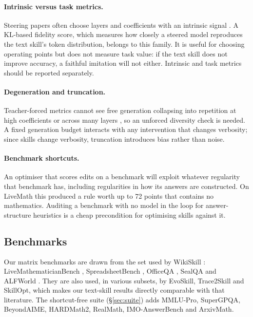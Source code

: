 \documentclass[11pt]{article}
\begin{document}
\paragraph{Intrinsic versus task metrics.} Steering papers often choose layers and coefficients with
an intrinsic signal \citep{panickssery2024caa}. A KL-based fidelity score, which measures how
closely a steered model reproduces the text skill's token distribution, belongs to this family. It
is useful for choosing operating points but does not measure task value: if the text skill does not
improve accuracy, a faithful imitation will not either. Intrinsic and task metrics should be
reported separately.

\paragraph{Degeneration and truncation.} Teacher-forced metrics cannot see free generation
collapsing into repetition at high coefficients or across many layers
\citep{turner2023actadd,panickssery2024caa}, so an unforced diversity check is needed. A fixed
generation budget interacts with any intervention that changes verbosity; since skills change
verbosity, truncation introduces bias rather than noise.

\paragraph{Benchmark shortcuts.} An optimiser that scores edits on a benchmark will exploit whatever
regularity that benchmark has, including regularities in how its answers are constructed. On
LiveMath this produced a rule worth up to 72 points that contains no mathematics. Auditing a
benchmark with no model in the loop for answer-structure heuristics is a cheap precondition for
optimising skills against it.

\subsection{Benchmarks}

Our matrix benchmarks are drawn from the set used by WikiSkill \citep{tang2026wikiskill}:
LiveMathematicianBench \citep{he2026livemath}, SpreadsheetBench \citep{ma2024spreadsheetbench},
OfficeQA \citep{databricks2025officeqa,opsahlong2026officeqapro}, SealQA \citep{pham2025sealqa} and
ALFWorld \citep{shridhar2021alfworld}. They are also used, in various subsets, by EvoSkill,
Trace2Skill and SkillOpt, which makes our text-skill results directly comparable with that
literature. The shortcut-free suite (\S\ref{sec:suite}) adds MMLU-Pro, SuperGPQA, BeyondAIME,
HARDMath2, RealMath, IMO-AnswerBench and ArxivMath.
\end{document}

